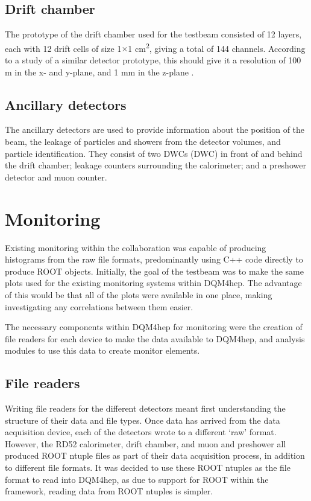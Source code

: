 \subsection{Drift chamber}
The prototype of the drift chamber used for the testbeam consisted of 12 layers, each with 12 drift cells of size 1$\times$1 cm\textsuperscript{2}, giving a total of 144 channels. According to a study of a similar detector prototype, this should give it a resolution of 100 \textmu m in the x- and y-plane, and 1 mm in the z-plane \cite{idea-drift-chamber} .

\subsection{Ancillary detectors}
The ancillary detectors are used to provide information about the position of the beam, the leakage of particles and showers from the detector volumes, and particle identification. They consist of two \acrlong{DWC}s (\acrshort{DWC}) in front of and behind the drift chamber; leakage counters surrounding the calorimeter; and a preshower detector and muon counter.

\section{Monitoring}
Existing monitoring within the collaboration was capable of producing histograms from the raw file formats, predominantly using C++ code directly to produce ROOT objects. Initially, the goal of the testbeam was to make the same plots used for the existing monitoring systems within \acrshort{DQM4hep}. The advantage of this would be that all of the plots were available in one place, making investigating any correlations between them easier.

The necessary components within \acrshort{DQM4hep} for monitoring were the creation of file readers for each device to make the data available to \acrshort{DQM4hep}, and analysis modules to use this data to create monitor elements.

\subsection{File readers}
Writing file readers for the different detectors meant first understanding the structure of their data and file types. Once data has arrived from the data acquisition device, each of the detectors wrote to a different `raw' format. However, the RD52 calorimeter, drift chamber, and muon and preshower all produced ROOT ntuple files as part of their data acquisition process, in addition to different file formats. It was decided to use these ROOT ntuples as the file format to read into \acrshort{DQM4hep}, as due to support for ROOT within the framework, reading data from ROOT ntuples is simpler.

